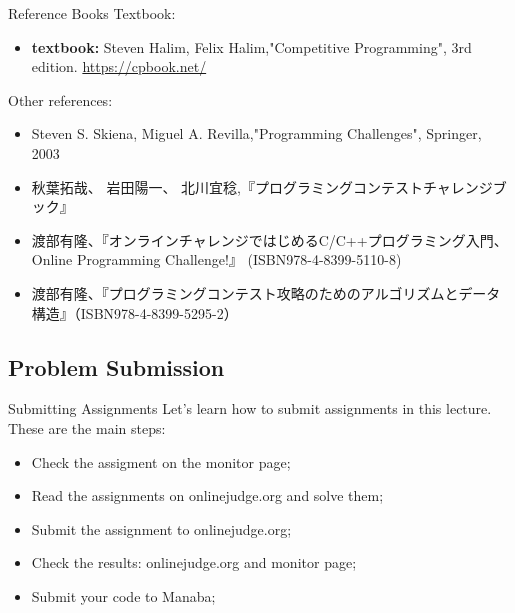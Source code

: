 \begin{frame}{Reference Books}
  Textbook:
  \begin{itemize}
    \item {\bf textbook:} Steven Halim, Felix Halim,"Competitive Programming", 3rd edition. \url{https://cpbook.net/}
  \end{itemize}
  \bigskip

  Other references:
  \begin{itemize}
    \item Steven S. Skiena, Miguel A. Revilla,"Programming Challenges", Springer, 2003
    \item 秋葉拓哉、 岩田陽一、 北川宜稔,『プログラミングコンテストチャレンジブック』
    \item 渡部有隆、『オンラインチャレンジではじめるC/C++プログラミング入門、Online Programming Challenge!』 (ISBN978-4-8399-5110-8)
    \item 渡部有隆、『プログラミングコンテスト攻略のためのアルゴリズムとデータ構造』（ISBN978-4-8399-5295-2）
  \end{itemize}
\end{frame}

\subsection{Problem Submission}
\begin{frame}{Submitting Assignments}
  Let's learn how to submit assignments in this lecture. These are the main steps:
  \begin{itemize}
    \item Check the assigment on the monitor page;
    \item Read the assignments on onlinejudge.org and solve them;
    \item Submit the assignment to onlinejudge.org;
    \item Check the results: onlinejudge.org and monitor page;
    \item Submit your code to Manaba;
  \end{itemize}
\end{frame}

